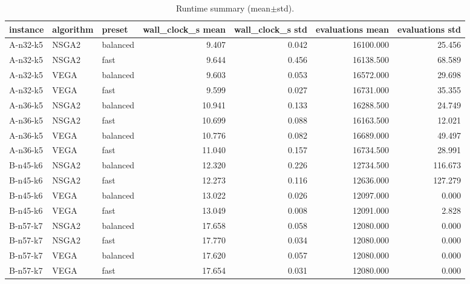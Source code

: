\begin{table}
\caption{Runtime summary (mean$\pm$std).}
\label{tab:runtime}
\begin{tabular}{lllrrrr}
\toprule
instance & algorithm & preset & wall_clock_s mean & wall_clock_s std & evaluations mean & evaluations std \\
\midrule
A-n32-k5 & NSGA2 & balanced & 9.407 & 0.042 & 16100.000 & 25.456 \\
A-n32-k5 & NSGA2 & fast & 9.644 & 0.456 & 16138.500 & 68.589 \\
A-n32-k5 & VEGA & balanced & 9.603 & 0.053 & 16572.000 & 29.698 \\
A-n32-k5 & VEGA & fast & 9.599 & 0.027 & 16731.000 & 35.355 \\
A-n36-k5 & NSGA2 & balanced & 10.941 & 0.133 & 16288.500 & 24.749 \\
A-n36-k5 & NSGA2 & fast & 10.699 & 0.088 & 16163.500 & 12.021 \\
A-n36-k5 & VEGA & balanced & 10.776 & 0.082 & 16689.000 & 49.497 \\
A-n36-k5 & VEGA & fast & 11.040 & 0.157 & 16734.500 & 28.991 \\
B-n45-k6 & NSGA2 & balanced & 12.320 & 0.226 & 12734.500 & 116.673 \\
B-n45-k6 & NSGA2 & fast & 12.273 & 0.116 & 12636.000 & 127.279 \\
B-n45-k6 & VEGA & balanced & 13.022 & 0.026 & 12097.000 & 0.000 \\
B-n45-k6 & VEGA & fast & 13.049 & 0.008 & 12091.000 & 2.828 \\
B-n57-k7 & NSGA2 & balanced & 17.658 & 0.058 & 12080.000 & 0.000 \\
B-n57-k7 & NSGA2 & fast & 17.770 & 0.034 & 12080.000 & 0.000 \\
B-n57-k7 & VEGA & balanced & 17.620 & 0.057 & 12080.000 & 0.000 \\
B-n57-k7 & VEGA & fast & 17.654 & 0.031 & 12080.000 & 0.000 \\
\bottomrule
\end{tabular}
\end{table}
